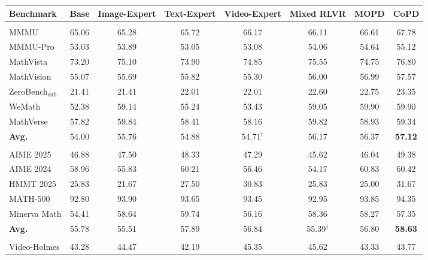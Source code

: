 \documentclass{llmxive}
\providecommand{\method}{\textsc{CoPD}\xspace}
\begin{document}
\begin{table}[t]
\centering
\setlength{\tabcolsep}{4pt}
\begin{tabular}{l cccc c c c}
\toprule
\textbf{Benchmark} & Base & Image-Expert & Text-Expert & Video-Expert & Mixed RLVR & MOPD & \textbf{\method} \\
\midrule
\rowcolor{gray!10} \multicolumn{8}{l}{\textit{Image Reasoning}} \\
\quad MMMU              & 65.06  & 65.28  & 65.72  & 66.17  & 66.11  & 66.61  & 67.78 \\
\quad MMMU-Pro          & 53.03  & 53.89  & 53.05  & 53.08  & 54.06  & 54.64  & 55.12 \\
\quad MathVista         & 73.20  & 75.10  & 73.90  & 74.85  & 75.55  & 74.75  & 76.80 \\
\quad MathVision        & 55.07  & 55.69  & 55.82  & 55.30  & 56.00  & 56.99  & 57.57 \\
\quad ZeroBench$_\text{sub}$ & 21.41  & 21.41  & 22.01  & 22.01  & 22.60  & 22.75  & 23.35 \\
\quad WeMath            & 52.38  & 59.14  & 55.24  & 53.43  & 59.05  & 59.90  & 59.90 \\
\quad MathVerse         & 57.82  & 59.84  & 58.41  & 58.16  & 59.82  & 58.93  & 59.34 \\
\cmidrule(lr){1-8}
\rowcolor{blue!5} \quad \textbf{Avg.} & 54.00  & 55.76  & 54.88  & 54.71$^\dagger$  & 56.17  & 56.37  & \textbf{57.12} \\
\midrule
\rowcolor{gray!10} \multicolumn{8}{l}{\textit{Text Reasoning}} \\
\quad AIME 2025         & 46.88  & 47.50  & 48.33  & 47.29  & 45.62  & 46.04  & 49.38 \\
\quad AIME 2024         & 58.96  & 55.83  & 60.21  & 56.46  & 54.17  & 60.83  & 60.42 \\
\quad HMMT 2025         & 25.83  & 21.67  & 27.50  & 30.83  & 25.83  & 25.00  & 31.67 \\
\quad MATH-500          & 92.80  & 93.90  & 93.65  & 93.45  & 92.95  & 93.85  & 94.35 \\
\quad Minerva Math      & 54.41  & 58.64  & 59.74  & 56.16  & 58.36  & 58.27  & 57.35 \\
\cmidrule(lr){1-8}
\rowcolor{blue!5} \quad \textbf{Avg.} & 55.78  & 55.51  & 57.89  & 56.84  & 55.39$^\dagger$  & 56.80  & \textbf{58.63} \\
\midrule
\rowcolor{gray!10} \multicolumn{8}{l}{\textit{Video Reasoning}} \\
\quad Video-Holmes       & 43.28  & 44.47  & 42.19  & 45.35  & 45.62  & 43.33  & 43.77 \\

\end{tabular}
\end{table}
\end{document}

